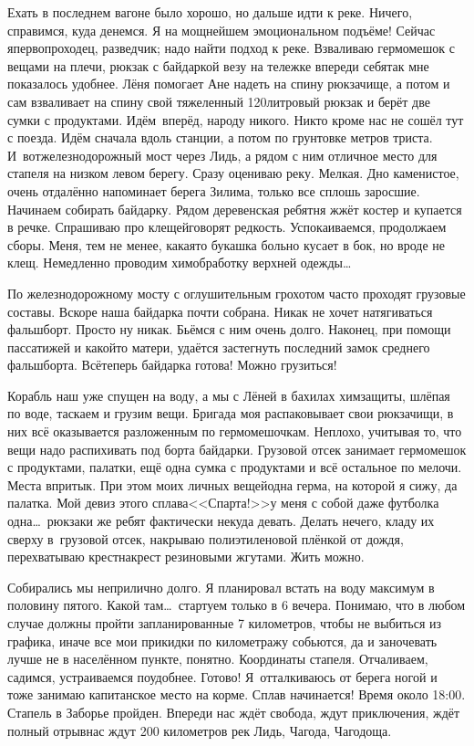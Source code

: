 Ехать в последнем вагоне было хорошо, но дальше идти к реке. Ничего, справимся, куда денемся. Я на мощнейшем эмоциональном подъёме! Сейчас я\mdash первопроходец, разведчик; надо найти подход к реке.  Взваливаю гермомешок с вещами на плечи, рюкзак с байдаркой везу на тележке впереди себя\mdash так мне показалось удобнее. Лёня помогает Ане надеть на спину рюкзачище, а потом и сам взваливает на спину свой тяжеленный 120\sdash литровый рюкзак и берёт две сумки с продуктами. Идём~вперёд, народу никого. Никто кроме нас не сошёл тут с поезда. Идём сначала вдоль станции, а потом по грунтовке метров триста. И~вот\mdash железнодорожный мост через Лидь, а рядом с ним отличное место для стапеля на низком левом берегу. 
\newpage
Сразу оцениваю реку. Мелкая. Дно каменистое, очень отдалённо напоминает берега Зилима, только все сплошь заросшие. Начинаем собирать байдарку. Рядом деревенская ребятня жжёт костер и купается в речке. Спрашиваю про клещей\mdash говорят редкость. Успокаиваемся, продолжаем сборы. Меня, тем не менее, какая\sdash то букашка больно кусает в бок, но вроде не клещ. Немедленно проводим химобработку верхней одежды\ldots~

По железнодорожному мосту с оглушительным грохотом часто проходят грузовые составы. Вскоре наша байдарка почти собрана. Никак не хочет натягиваться фальшборт. Просто ну никак. Бьёмся с ним очень долго. Наконец, при помощи пассатижей и какой\sdash то матери, удаётся застегнуть последний замок среднего фальшборта. Всё\mdash теперь байдарка готова! Можно грузиться! 

Корабль наш уже спущен на воду, а мы с Лёней в бахилах химзащиты, шлёпая по воде, таскаем и грузим вещи. Бригада моя распаковывает свои рюкзачищи, в них всё оказывается разложенным по гермомешочкам. Неплохо, учитывая то, что вещи надо распихивать под борта байдарки. Грузовой отсек занимает гермомешок с продуктами, палатки, ещё одна сумка с продуктами и всё остальное по мелочи. Места впритык. При этом моих личных вещей\mdash одна герма, на которой я сижу, да палатка. Мой девиз этого сплава\mdash <<Спарта!>>\mdash у меня с собой даже футболка одна\ldots~рюкзаки же ребят фактически некуда девать. Делать нечего, кладу их сверху в~грузовой отсек, накрываю полиэтиленовой плёнкой от дождя, перехватываю крест\sdash накрест резиновыми жгутами. Жить можно. 

Собирались мы неприлично долго. Я планировал встать на воду максимум в половину пятого. Какой там\ldots~стартуем только в 6 вечера. Понимаю, что в любом случае должны пройти запланированные 7 километров, чтобы не выбиться из графика, иначе все мои прикидки по километражу собьются, да и заночевать лучше не в населённом пункте, понятно. Координаты стапеля. Отчаливаем, садимся, устраиваемся поудобнее. Готово! Я~отталкиваюсь от берега ногой и тоже занимаю капитанское место на корме. Сплав начинается! Время около 18:00. Стапель в Заборье пройден. Впереди нас ждёт свобода, ждут приключения, ждёт полный отрыв\mdash нас ждут 200 километров рек Лидь, Чагода, Чагодоща. 

